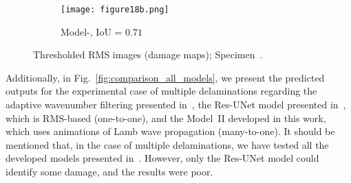 \begin{sloppypar}
\begin{figure} [!ht]
\begin{subfigure}[b]{.49\textwidth}
		\end{subfigure}
		\hfill
		\begin{subfigure}[b]{.49\textwidth}
			\centering
			\texttt{[image: figure18b.png]}
			\caption{Model-, IoU = \(0.71\)} 
			\label{fig:RMS_threshold_L3_S4_B_ijjeh}
		\end{subfigure}
		\caption{Thresholded RMS images (damage maps); Specimen~.}
		\label{fig:RMS_threshold_L3_S4_B__images}
	\end{figure} 
	
	\par\bigskip
	\par\bigskip
	\par\bigskip
	\par\bigskip
	
	Additionally, in Fig.~\ref{fig:comparison_all_models}, we present the predicted outputs for the experimental case of multiple delaminations regarding the adaptive wavenumber filtering presented in~\cite{Kudela2015,Radzienski2019a}, the Res-UNet model presented in~\cite{Ijjeh2022}, which is RMS-based (one-to-one), and the Model~II developed in this work, which uses animations of Lamb wave propagation (many-to-one).
	It should be mentioned that, in the case of multiple delaminations, we have tested all the developed models presented in~\cite{Ijjeh2022}.
	However, only the Res-UNet model could identify some damage, and the results were poor.


\end{sloppypar}
